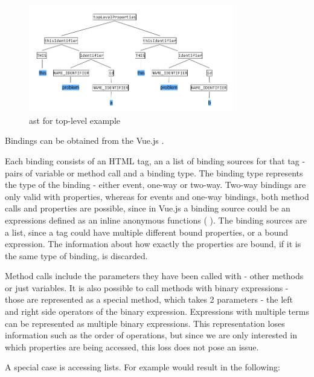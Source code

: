 \begin{figure}[H]
    \includegraphics[width=0.8\textwidth]{images/ast_top_level.png}
     \caption{\gls{ast} for top-level example }
     \label{fig:ast_top_level}
\end{figure}

Bindings can be obtained from the Vue.js .

Each binding consists of an HTML tag, an a list of binding sources for that tag - pairs of variable or method call and a binding type. The binding type represents the type of the binding - either event, one-way or two-way. Two-way bindings are only valid with properties, whereas for events and one-way bindings, both method calls and properties are possible, since in Vue.js a binding source could be an expressions defined as an inline anonymous functions (
). The binding sources are a list, since a tag could have multiple different bound properties, or a bound expression. The information about how exactly the properties are bound, if it is the same type of binding, is discarded.

Method calls include the parameters they have been called with - other methods or just variables. It is also possible to call methods with binary expressions - those are represented as a special method, which takes 2 parameters - the left and right side operators of the binary expression. Expressions with multiple terms can be represented as multiple binary expressions. This representation loses information such as the order of operations, but since we are only interested in which properties are being accessed, this loss does not pose an issue.

A special case is accessing lists. For example  would result in the following:

